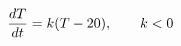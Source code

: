 \documentclass[preview]{standalone}
\begin{document}
\begin{align*}
\special{dvisvgm:raw <g id='unique000'>}\frac{dT}{dt} = k(T - 20), \qquad k < 0\special{dvisvgm:raw </g>}
\end{align*}
\end{document}
